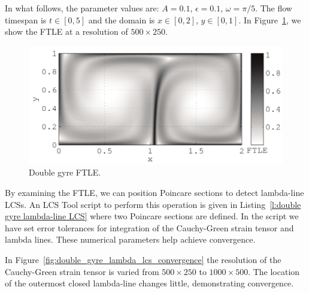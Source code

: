 \documentclass{article}
\begin{document}
In what follows, the parameter values are: $A = 0.1$, $\epsilon = 0.1$, $\omega = \pi/5$. The flow timespan is $t \in [0,5]$ and the domain is $x \in [0,2]$, $y \in [0,1]$. In Figure~\ref{f:double gyre FTLE}, we show the FTLE at a resolution of $500\times250$.

\begin{figure}
\begin{center}
\includegraphics[width=\textwidth]{graphics/double_gyre/ftle}
\end{center}
\caption{Double gyre FTLE.}
\label{f:double gyre FTLE}
\end{figure}

By examining the FTLE, we can position Poincare sections to detect lambda-line LCSs. An LCS Tool script to perform this operation is given in Listing~\ref{l:double gyre lambda-line LCS} where two Poincare sections are defined. In the script we have set error tolerances for integration of the Cauchy-Green strain tensor and lambda lines. These numerical parameters help achieve convergence.



In Figure~\ref{fig:double_gyre_lambda_lcs_convergence} the resolution of the  Cauchy-Green strain tensor is varied from $500 \times 250$ to $1000 \times 500$. The location of the outermost closed lambda-line changes little, demonstrating convergence.
\end{document}
